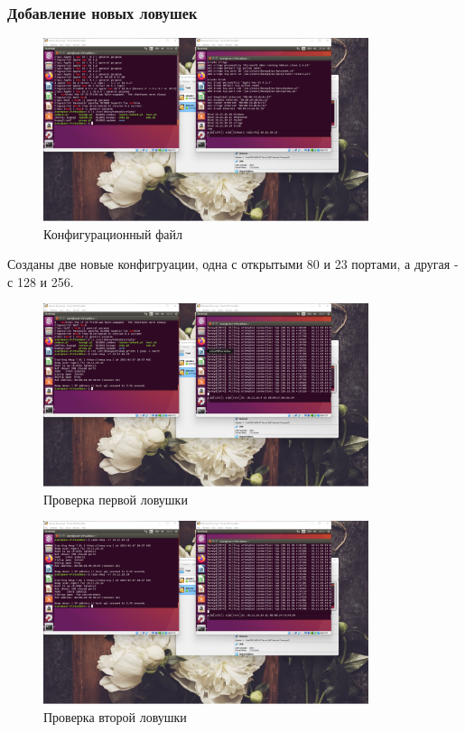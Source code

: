 \documentclass[a4paper]{article}
\begin{document}
  \subsubsection{Добавление новых ловушек}

  \begin{figure}[H]
    \centering
    \includegraphics[width=0.85\textwidth]{01_00 (43)}
    \caption{Конфигурационный файл}
  \end{figure}

  Созданы две новые конфигруации, одна с открытыми 80 и 23 портами,
  а другая - с 128 и 256.

  \begin{figure}[H]
    \centering
    \includegraphics[width=0.85\textwidth]{01_00 (44)}
    \caption{Проверка первой ловушки}
  \end{figure}
  
  \begin{figure}[H]
    \centering
    \includegraphics[width=0.85\textwidth]{01_00 (45)}
    \caption{Проверка второй ловушки}
  \end{figure}
\end{document}
